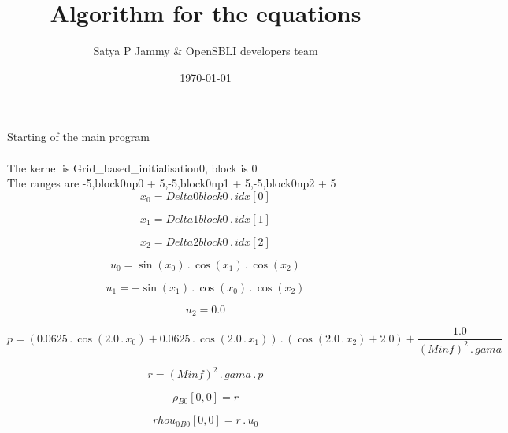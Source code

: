 \documentclass{article}
\title{Algorithm for the equations}
\author{Satya P Jammy \& OpenSBLI developers team}
\date{\today}
\begin{document}
\maketitle
\noindent Starting of the main program\\
\\\noindent The kernel is Grid_based_initialisation0, block is 0\\\noindent The ranges are -5,block0np0 + 5,-5,block0np1 + 5,-5,block0np2 + 5\\\begin{dmath}x_{0} = Delta0block0 \,.\, {idx}[{0}]\end{dmath}

\begin{dmath}x_{1} = Delta1block0 \,.\, {idx}[{1}]\end{dmath}

\begin{dmath}x_{2} = Delta2block0 \,.\, {idx}[{2}]\end{dmath}

\begin{dmath}u_{0} = \sin{\left (x_{0} \right )} \,.\, \cos{\left (x_{1} \right )} \,.\, \cos{\left (x_{2} \right )}\end{dmath}

\begin{dmath}u_{1} = - \sin{\left (x_{1} \right )} \,.\, \cos{\left (x_{0} \right )} \,.\, \cos{\left (x_{2} \right )}\end{dmath}

\begin{dmath}u_{2} = 0.0\end{dmath}

\begin{dmath}p = \left(0.0625 \,.\, \cos{\left (2.0 \,.\, x_{0} \right )} + 0.0625 \,.\, \cos{\left (2.0 \,.\, x_{1} \right )}\right) \,.\, \left(\cos{\left (2.0 \,.\, x_{2} \right )} + 2.0\right) + \frac{1.0}{\left(Minf \right)^{2} \,.\, 
gama}\end{dmath}

\begin{dmath}r = \left(Minf \right)^{2} \,.\, gama \,.\, p\end{dmath}

\begin{dmath}{\rho{_{B0}}}[{0,0}] = r\end{dmath}

\begin{dmath}{rhou_{0}{_{B0}}}[{0,0}] = r \,.\, u_{0}\end{dmath}
\end{document}
